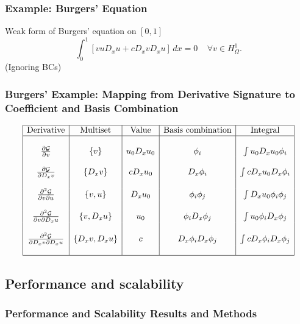 \documentclass[10pt,xcolor=dvipsnames]{beamer}
\newcommand{\pd}[2]{\frac{\partial #1}{\partial #2}}
\newcommand{\pmix}[3]{\frac{\partial^2 #1}{\partial #2 \partial #3}}
\newcommand{\op}[1]{{\mathcal{#1}}}
\begin{document}
\frame
{
\frametitle{Example: Burgers' Equation}

\begin{block}{Weak form of Burgers' equation on $\left[0,1\right]$}
\[
\int_0^1 \left[v u D_x u + c D_x v D_x u \right] \, dx = 0
\;\;\;\;\forall v\in H^1_\Omega.
\]
(Ignoring BCs)
\end{block}
}

\frame
{
\frametitle{Burgers' Example: Mapping from Derivative Signature
to Coefficient and Basis Combination}
\begin{block}{}
{\footnotesize
\[
\begin{array}{|c|c|c|c|c|}
\hline
\text{Derivative} & \text{Multiset} & \text{Value} & \text{Basis combination} & \text{Integral}\\
\hline
&&&&\\
\pd{\op{G}}{v}         & \left\{v\right\}         &      u_0 D_x u_0          & \phi_i                   & \int u_0 D_x u_0 \phi_i  \\
&&&&\\
\pd{\op{G}}{D_x v}     & \left\{D_x v\right\}     &      c D_x u_0          & D_x \phi_i                   & \int c D_x u_0 D_x \phi_i  \\
&&&&\\
\pmix{\op{G}}{v}{u}   &\left\{v, u\right\}     &      D_x u_0          & \phi_i \phi_j               & \int D_x u_0 \phi_i \phi_j \\
&&&&\\
\pmix{\op{G}}{v}{D_x u} & \left\{v, D_x u\right\}     &      u_0          & \phi_i D_x \phi_j           & \int u_0 \phi_i D_x \phi_j \\
&&&&\\
\pmix{\op{G}}{D_x v}{D_x u} & \left\{D_x v, D_x u\right\}     &      c          & D_x \phi_i D_x \phi_j       & \int c D_x \phi_i D_x \phi_j\\
&&&&\\
\hline
\end{array}
\]
}
\end{block}
}




\subsection{Performance and scalability}

\frame
{
  \frametitle{Performance and Scalability Results and Methods}
}
\end{document}

